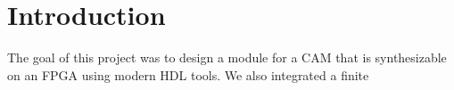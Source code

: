 \section{Introduction}
The goal of this project was to design a module for a CAM that is synthesizable on an FPGA using modern HDL tools. 
We also integrated a finite 